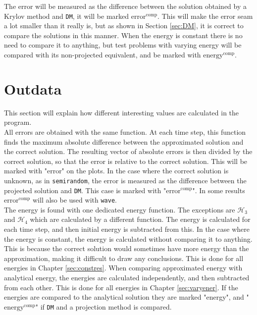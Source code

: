 \noindent The error will be measured as the difference between the solution obtained by a Krylov method and \texttt{DM}, it will be marked $\text{error}^{\text{comp}}$. This will make the error seam a lot smaller than it really is, but as shown in Section \ref{sec:DM}, it is correct to compare the solutions in this manner. When the energy is constant there is no need to compare it to anything, but test problems with varying energy will be compared with its non-projected equivalent, and be marked with $\text{energy}^{\text{comp}}$.

\section{Outdata} %
\label{sec:outdata}
This section will explain how different interesting values are calculated in the program. \\

\noindent All errors are obtained with the same function. At each time step, this function finds the maximum absolute difference between the approximated solution and the correct solution. The resulting vector of absolute errors is then divided by the correct solution, so that the error is relative to the correct solution. This will be marked with "error" on the plots. In the case where the correct solution is unknown, as in \texttt{semirandom}, the error is measured as the difference between the projected solution and \texttt{DM}. This case is marked with "$\text{error}^{\text{comp}}$". In some results $\text{error}^{\text{comp}}$ will also be used with \texttt{wave}.  \\

\noindent The energy is found with one dedicated energy function. The exceptions are $\mathcal{H}_3$ and $\mathcal{H}_4$ which are calculated by a different function. The energy is calculated for each time step, and then initial energy is subtracted from this. In the case where the energy is constant, the energy is calculated without comparing it to anything. This is because the correct solution would sometimes have more energy than the approximation, making it difficult to draw any conclusions. This is done for all energies in Chapter \ref{sec:constres}. When comparing approximated energy with analytical energy, the energies are calculated independently, and then subtracted from each other. This is done for all energies in Chapter \ref{sec:varyener}. If the energies are compared to the analytical solution they are marked "energy", and "$\text{energy}^{\text{comp}}$" if \texttt{DM} and a projection method is compared. \\

